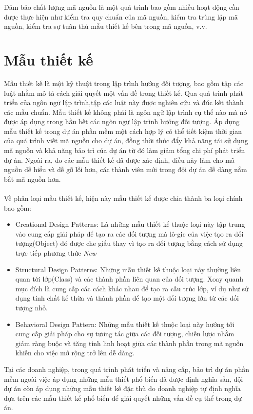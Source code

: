 \documentclass[12pt]{report}
\begin{document}
\noindent Đảm bảo chất lượng mã nguồn là một quá trình bao gồm nhiều hoạt động cần được thực hiện như kiểm tra quy chuẩn của mã nguồn, kiểm tra trùng lặp mã nguồn, kiểm tra sự tuân thủ mẫu thiết kế bên trong mã nguồn, v.v.
\section{Mẫu thiết kế}
Mẫu thiết kế \cite{go4} là một kỹ thuật trong lập trình hướng đối tượng, bao gồm tập các luật nhằm mô tả cách giải quyết một vấn đề trong thiết kế. Qua quá trình phát triển của ngôn ngữ lập trình,tập các luật này được nghiên cứu và đúc kết thành các mẫu chuẩn. Mẫu thiết kế không phải là ngôn ngữ lập trình cụ thể nào mà nó được áp dụng trong hầu hết các ngôn ngữ lập trình hướng đối tượng.
Áp dụng mẫu thiết kế trong dự án phần mềm một cách hợp lý có thể tiết kiệm thời gian của quá trình viết mã nguồn cho dự án, đồng thời thúc đẩy khả năng tái sử dụng mã nguồn và khả năng bảo trì của dự án từ đó làm giảm tổng chi phí phát triển dự án. Ngoài ra, do các mẫu thiết kế đã được xác định, điều này làm cho mã nguồn dễ hiểu và dễ gỡ lỗi hơn, các thành viên mới trong đội dự án dễ dàng nắm bắt mã nguồn hơn.
\\\\
Về phân loại mẫu thiết kế, hiện này mẫu thiết kế được chia thành ba loại chính bao gồm:
\begin{itemize}
	\item Creational Design Patterns: Là những mẫu thiết kế thuộc loại này tập trung vào cung cấp giải pháp để tạo ra các đối tượng mà lô-gic của việc tạo ra đối tượng(Object) đó được che giấu thay vì tạo ra đối tượng bằng cách sử dụng trực tiếp phương thức \textit{New}
	\item Structural Design Patterns: Những mẫu thiết kế thuộc loại này thường liên quan tới lớp(Class) và các thành phần liên quan của đối tượng. Xoay quanh mục đích là cung cấp các cách khác nhau để tạo ra cấu trúc lớp, ví dụ như sử dụng tính chất kế thừa và thành phần để tạo một đối tượng lớn từ các đối tượng nhỏ.
	\item Behavioral Design Pattern: Những mẫu thiết kế thuộc loại này hướng tới cung cấp giải pháp cho sự tương tác giữa các đối tượng, chiến lược nhằm giảm ràng buộc và tăng tính linh hoạt giữa các thành phần trong mã nguồn khiến cho việc mở rộng trở lên dễ dàng.
\end{itemize}
Tại các doanh nghiệp, trong quá trình phát triển và nâng cấp, bảo trì dự án phần mềm ngoài việc áp dụng những mẫu thiết phổ biến đã được định nghĩa sẵn, đội dự án còn áp dụng những mẫu thiết kế đặc thù do doanh nghiệp tự định nghĩa dựa trên các mẫu thiết kế phổ biến để giải quyết những vấn đề cụ thể trong dự án.
\end{document}
